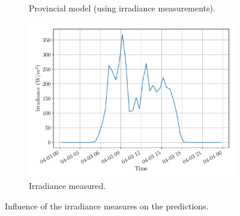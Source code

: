 \documentclass[a4paper, 12pt]{article}
\begin{document}
\begin{figure}[H]
\begin{subfigure}{0.48\textwidth}
		\caption{Provincial model (using irradiance measurements).}
	\end{subfigure}
	\hspace{0.5em}
	\begin{subfigure}{0.48\textwidth}
		\centering
		\includegraphics[width=\textwidth]{resources/pdf/irradiance_meas_for (START_FOR 03-04-2020).pdf}
		\vspace{-0.5em}
		\caption{Irradiance measured.}
	\end{subfigure}
	\caption{Influence of the irradiance measures on the predictions.}
	\label{fig:irradiance_meas_influence}
\end{figure}
\end{document}
